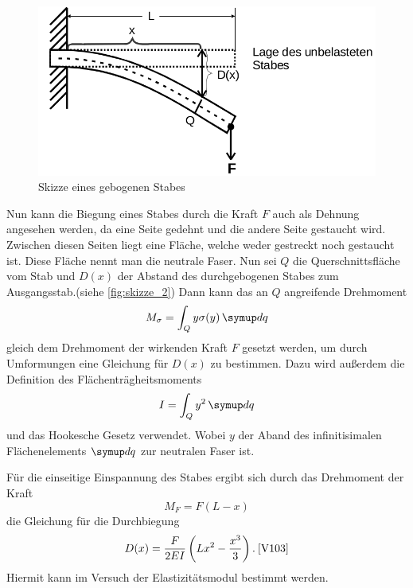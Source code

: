 \begin{figure}
    \centering
    \includegraphics[width=\textwidth/2]{images/skizze_2.png}
    \caption{Skizze eines gebogenen Stabes\cite{V103}}
    \label{fig:skizze_2}
\end{figure}
Nun kann die Biegung eines Stabes durch die Kraft $F$ auch als Dehnung angesehen werden, da eine Seite gedehnt und die andere Seite gestaucht wird.
Zwischen diesen Seiten liegt eine Fläche, welche weder gestreckt noch gestaucht ist.
Diese Fläche nennt man die neutrale Faser. Nun sei $Q$ die Querschnittsfläche vom Stab und $D(x)$ der Abstand des durchgebogenen Stabes zum Ausgangsstab.(siehe \autoref{fig:skizze_2})
Dann kann das an $Q$ angreifende Drehmoment
\begin{equation}
    M_\sigma = \int_Q y\sigma(y)\dif{q}
    \label{eq:drehmoment_sigma}
\end{equation}
gleich dem Drehmoment der wirkenden Kraft $F$ gesetzt werden, um durch Umformungen eine Gleichung für $D(x)$ zu bestimmen.
Dazu wird außerdem die Definition des Flächenträgheitsmoments
\begin{equation}
    I = \int_Q y^2 \dif{q}
    \label{eq:flächentragheitsmoment}
\end{equation}
und das Hookesche Gesetz verwendet. Wobei $y$ der Aband des infinitisimalen Flächenelements $\dif{q}$ zur neutralen Faser ist.

Für die einseitige Einspannung des Stabes ergibt sich durch das Drehmoment der Kraft
\begin{equation}
    M_F = F (L-x)
    \label{eq:drehmoment_einseitig}
\end{equation}
die Gleichung für die Durchbiegung
\begin{equation}
    D(x) = \frac{F}{2EI} \left( Lx^2 - \frac{x^3}{3} \right). \: \text{\cite{V103}}
    \label{eq:durchbiegung_einseitig}
\end{equation}
Hiermit kann im Versuch der Elastizitätsmodul bestimmt werden.

